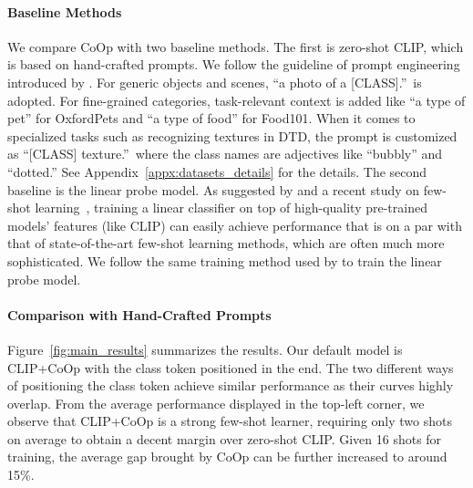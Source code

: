 \paragraph{Baseline Methods}
We compare CoOp with two baseline methods. The first is zero-shot CLIP, which is based on hand-crafted prompts. We follow the guideline of prompt engineering introduced by \citet{radford2021learning}. For generic objects and scenes, ``a photo of a [CLASS].''~is adopted. For fine-grained categories, task-relevant context is added like ``a type of pet'' for OxfordPets and ``a type of food'' for Food101. When it comes to specialized tasks such as recognizing textures in DTD, the prompt is customized as ``[CLASS] texture.''~where the class names are adjectives like ``bubbly'' and ``dotted.'' See Appendix~\ref{appx:datasets_details} for the details. The second baseline is the linear probe model. As suggested by \citet{radford2021learning} and a recent study on few-shot learning~\citep{tian2020rethinking}, training a linear classifier on top of high-quality pre-trained models' features (like CLIP) can easily achieve performance that is on a par with that of state-of-the-art few-shot learning methods, which are often much more sophisticated. We follow the same training method used by \citet{radford2021learning} to train the linear probe model.


\paragraph{Comparison with Hand-Crafted Prompts}
Figure~\ref{fig:main_results} summarizes the results. Our default model is CLIP+CoOp with the class token positioned in the end. The two different ways of positioning the class token achieve similar performance as their curves highly overlap. From the average performance displayed in the top-left corner, we observe that CLIP+CoOp is a strong few-shot learner, requiring only two shots on average to obtain a decent margin over zero-shot CLIP. Given 16 shots for training, the average gap brought by CoOp can be further increased to around 15\%.

